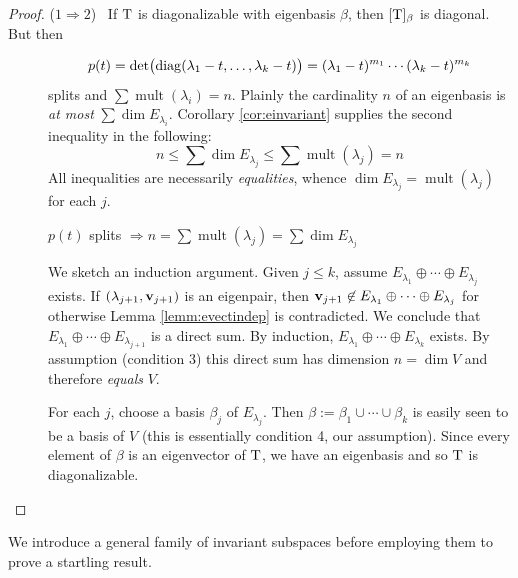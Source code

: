 \begin{proof}
	($1 \Rightarrow 2$) \ If $\mathrm{T}$ is diagonalizable with eigenbasis $\beta$, then $[\mathrm{T}]_\beta$ is diagonal. But then\vspace{-22pt}
	\begin{description}
	  \item[] 
	  \[
	  	p(t) =\det\bigl(\operatorname{diag}(\lambda_1-t,\ldots,\lambda_k-t)\bigr) 
	  	=(\lambda_1-t)^{m_1}\cdots (\lambda_k-t)^{m_k}
	  \]
	  splits and $\sum\operatorname{mult}(\lambda_i)=n$. Plainly the cardinality $n$ of an eigenbasis is \emph{at most} $\sum\dim E_{\lambda_i}$. Corollary \ref{cor:einvariant} supplies the second inequality in the following:
	  \[
	  	n\le\sum\dim E_{\lambda_j}\le\sum\operatorname{mult}(\lambda_j)=n
	  \]
	  All inequalities are necessarily \emph{equalities}, whence $\dim E_{\lambda_j}=\operatorname{mult}(\lambda_j)$ for each $j$.
	  
	  \item[] $p(t)$ splits $\Longrightarrow n=\sum\operatorname{mult}(\lambda_j)=\sum\dim E_{\lambda_j}$
	  
	  \item[] We sketch an induction argument.\smallbreak
	  Given $j\le k$, assume $E_{\lambda_1}\oplus\cdots\oplus E_{\lambda_j}$ exists. If $(\lambda_{j+1},{\mathbf{v}}_{j+1})$ is an eigenpair, then ${\mathbf{v}}_{j+1}\not\in E_{\lambda_1}\oplus\cdots\oplus E_{\lambda_j}$ for otherwise Lemma \ref{lemm:evectindep} is contradicted. We conclude that $E_{\lambda_1}\oplus\cdots\oplus E_{\lambda_{j+1}}$ is a direct sum.\smallbreak
	  By induction, $E_{\lambda_1}\oplus\cdots\oplus E_{\lambda_k}$ exists. By assumption (condition 3) this direct sum has dimension $n=\dim V$ and therefore \emph{equals} $V$.
	  
	  \item[] For each $j$, choose a basis $\beta_j$ of $E_{\lambda_j}$. Then $\beta:=\beta_1\cup\cdots\cup \beta_k$ is easily seen to be a basis of $V$ (this is essentially condition 4, our assumption). Since every element of $\beta$ is an eigenvector of $\mathrm{T}$, we have an eigenbasis and so $\mathrm{T}$ is diagonalizable.\qedhere
	\end{description}
\end{proof}





We introduce a general family of invariant subspaces before employing them to prove a startling result.

